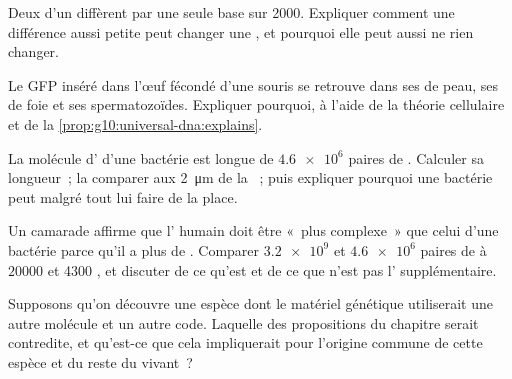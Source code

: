 \begin{exercise}[$\star\star$]\label{exo:g10:universal-dna:10}
Deux  d'un  diffèrent par une seule base sur 2000.
Expliquer comment une différence aussi petite peut changer une
, et pourquoi elle peut aussi ne rien changer.
\end{exercise}

\begin{exercise}[$\star\star$]\label{exo:g10:universal-dna:11}
Le  GFP inséré dans l'œuf fécondé d'une souris se retrouve dans ses
 de peau, ses  de foie et ses spermatozoïdes.
Expliquer pourquoi, à l'aide de la théorie cellulaire et de la
\cref{prop:g10:universal-dna:explains}.
\end{exercise}

\begin{exercise}[$\star\star\star$]\label{exo:g10:universal-dna:12}
La molécule d' d'une bactérie est longue de $\num{4.6e6}$ paires de
. Calculer sa longueur~; la comparer aux \qty{2}{\micro m} de la
~; puis expliquer pourquoi une bactérie peut malgré tout lui
faire de la place.
\end{exercise}

\begin{exercise}[$\star\star\star$]\label{exo:g10:universal-dna:13}
Un camarade affirme que l' humain doit être «~plus complexe~» que
celui d'une bactérie parce qu'il a plus de . Comparer
$\num{3.2e9}$ et $\num{4.6e6}$ paires de  à $\num{20000}$ et 4300
, et discuter de ce qu'est et de ce que n'est pas l'
supplémentaire.
\end{exercise}

\begin{exercise}[$\star\star\star$]\label{exo:g10:universal-dna:14}
Supposons qu'on découvre une espèce dont le matériel génétique
utiliserait une autre molécule et un autre code. Laquelle des
propositions du chapitre serait contredite, et qu'est-ce que cela
impliquerait pour l'origine commune de cette espèce et du reste du
vivant~?
\end{exercise}

